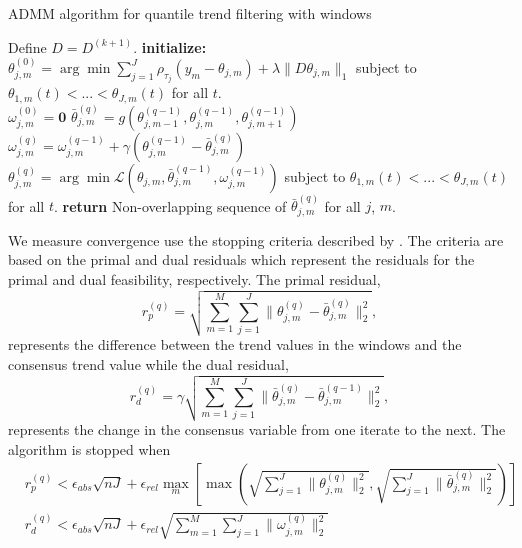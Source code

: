 \documentclass[12pt]{article}
\begin{document}
	\begin{algorithm}
		\caption{ADMM algorithm for quantile trend filtering with windows}\label{euclid}
		\begin{algorithmic}		
			\State Define $D = D^{(k+1)}$. 
			\State \textbf{initialize:} \\
				 $\theta_{j,m}^{(0)} = \arg \min \sum_{j=1}^J\rho_{\tau_j}(y_m - \theta_{j,m})+\lambda \lVert D\theta_{j,m}\rVert_1$ subject to $\theta_{1,m}(t) < ...<\theta_{J,m}(t)$ for all $t$. \\		
			 	 $\omega_{j,m}^{(0)} = \mathbf{0}$	
			\Repeat{}
			\State  		
			$\bar{\theta}_{j,m}^{(q)} = g(\theta_{j, m-1}^{(q-1)}, \theta_{j,m}^{(q-1)}, \theta_{j,m+1}^{(q-1)})$
			\State 
			$\omega_{j,m}^{(q)} = \omega_{j,m}^{(q-1)} + \gamma(\theta_{j,m}^{(q-1)} - \bar{\theta}_{j,m}^{(q)})$	
			\State
				$\theta_{j,m}^{(q)} = \arg\min \mathcal{L}(\theta_{j,m}, \bar{\theta}_{j,m}^{(q-1)}, \omega_{j,m}^{(q-1)})$			
			 subject to $\theta_{1,m}(t) < ...<\theta_{J,m}(t)$ for all $t$.
			\State \textbf{return} Non-overlapping sequence of $\bar{\theta}_{j,m}^{(q)}$ for all $j$, $m$.
			
		\end{algorithmic}
	\end{algorithm}

	We measure convergence use the stopping criteria described by \cite{boyd2011distributed}. The criteria are based on the primal and dual residuals which represent the residuals for the primal and dual feasibility, respectively. The primal residual, 
	\begin{equation}
	r_p^{(q)} = \sqrt{\sum_{m=1}^M\sum_{j=1}^J\lVert\theta_{j,m}^{(q)} - \bar{\theta}_{j,m}^{(q)}\rVert_2^2},
	\end{equation}
	represents the difference between the trend values in the windows and the consensus trend value while the dual residual,
	\begin{equation*}
	r_d^{(q)} = \gamma\sqrt{\sum_{m=1}^M \sum_{j=1}^J\lVert\bar{\theta}_{j,m}^{(q)} - \bar{\theta}_{j,m}^{(q-1)}\rVert_2^2},
	\end{equation*}
	represents the change in the consensus variable from one iterate to the next. The algorithm is stopped when 
	\begin{align}
		&r_p^{(q)} < \epsilon_{abs}\sqrt{nJ} + \epsilon_{rel}\underset{m}{\max}\left[\max 
		\left(\sqrt{\sum_{j=1}^J \lVert\theta_{j,m}^{(q)}\rVert_2^2}, \sqrt{\sum_{j=1}^J \lVert \bar{\theta}_{j,m}^{(q)} \rVert_2^2} \right )\right]\\
		&r_d^{(q)} < \epsilon_{abs}\sqrt{nJ} + \epsilon_{rel}\sqrt{\sum_{m=1}^M\sum_{j=1}^J\lVert \omega_{j,m}^{(q)}\rVert_2^2}
	\end{align}
	
\end{document}
